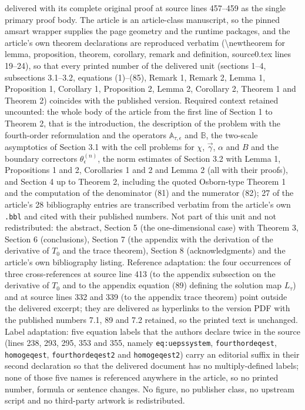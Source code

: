\documentclass[10pt,a4paper]{amsart}
\begin{document}
delivered with its complete original proof at source lines 457--459 as the single primary proof body. The article is an article-class manuscript, so the pinned amsart wrapper supplies the page geometry and the runtime packages, and the article's own theorem declarations are reproduced verbatim (\textbackslash{}newtheorem for lemma, proposition, theorem, corollary, remark and definition, source0.tex lines 19--24), so that every printed number of the delivered unit (sections 1--4, subsections 3.1--3.2, equations (1)--(85), Remark 1, Remark 2, Lemma 1, Proposition 1, Corollary 1, Proposition 2, Lemma 2, Corollary 2, Theorem 1 and Theorem 2) coincides with the published version. Required context retained uncounted: the whole body of the article from the first line of Section 1 to Theorem 2, that is the introduction, the description of the problem with the fourth-order reformulation and the operators $\mathbb{A}_{\tau,\epsilon}$ and $\mathbb{B}$, the two-scale asymptotics of Section 3.1 with the cell problems for $\chi$, $\vec{\gamma}$, $\alpha$ and $B$ and the boundary correctors $\theta_\epsilon^{(n)}$, the norm estimates of Section 3.2 with Lemma 1, Propositions 1 and 2, Corollaries 1 and 2 and Lemma 2 (all with their proofs), and Section 4 up to Theorem 2, including the quoted Osborn-type Theorem 1 and the computation of the denominator (81) and the numerator (82); 27 of the article's 28 bibliography entries are transcribed verbatim from the article's own \texttt{.bbl} and cited with their published numbers. Not part of this unit and not redistributed: the abstract, Section 5 (the one-dimensional case) with Theorem 3, Section 6 (conclusions), Section 7 (the appendix with the derivation of the derivative of $T_0$ and the trace theorem), Section 8 (acknowledgments) and the article's own bibliography listing. Reference adaptation: the four occurrences of three cross-references at source line 413 (to the appendix subsection on the derivative of $T_0$ and to the appendix equation (89) defining the solution map $L_\tau$) and at source lines 332 and 339 (to the appendix trace theorem) point outside the delivered excerpt; they are delivered as hyperlinks to the version PDF with the published numbers 7.1, 89 and 7.2 retained, so the printed text is unchanged. Label adaptation: five equation labels that the authors declare twice in the source (lines 238, 293, 295, 353 and 355, namely \texttt{eq:uepssystem}, \texttt{fourthordeqest}, \texttt{homogeqest}, \texttt{fourthordeqest2} and \texttt{homogeqest2}) carry an editorial suffix in their second declaration so that the delivered document has no multiply-defined labels; none of those five names is referenced anywhere in the article, so no printed number, formula or sentence changes. No figure, no publisher class, no upstream script and no third-party artwork is redistributed.
\par\smallskip
\end{document}
